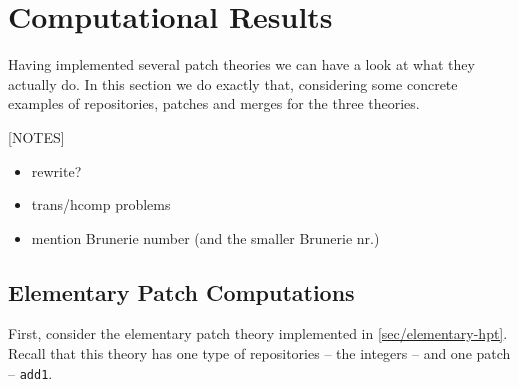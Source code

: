 \section{Computational Results}\label{sec:results}

Having implemented several patch theories we can have a look at what they actually do.
In this section we do exactly that, considering some concrete examples of repositories,
patches and merges for the three theories.

[NOTES]
\begin{itemize}
\item rewrite?
\item trans/hcomp problems
\item mention Brunerie number (and the smaller Brunerie nr.)
\end{itemize}

\subsection{Elementary Patch Computations}

First, consider the elementary patch theory implemented in \autoref{sec/elementary-hpt}.
Recall that this theory has one type of repositories -- the integers -- and one patch
-- \texttt{add1}.

\begin{code}[hide]%
\>[0]\AgdaSymbol{\{-\#}\AgdaSpace{}%
\AgdaSpace{}%
\AgdaSpace{}%
\AgdaSpace{}%
\AgdaSpace{}%
\AgdaSymbol{\#-\}}\<%
\\
\>[0]\AgdaSpace{}%
\AgdaSpace{}%
\<%
\\
\>[0]\AgdaSpace{}%
\AgdaSpace{}%
\<%
\\
\>[0]\AgdaSpace{}%
\AgdaSpace{}%
\<%
\\
\>[0][@{}l@{\AgdaIndent{0}}]%
\>[2]\AgdaSymbol{(}\AgdaSymbol{)}\<%
\\
\>[0]\AgdaSpace{}%
\AgdaModule{\AgdaUnderscore{}}\AgdaSpace{}%
\<%
\\
\>[0][@{}l@{\AgdaIndent{0}}]%
\>[2]\AgdaSpace{}%
\AgdaSpace{}%
\<%
\\
%
\>[2]\AgdaSpace{}%
\AgdaSpace{}%
\<%
\end{code}

